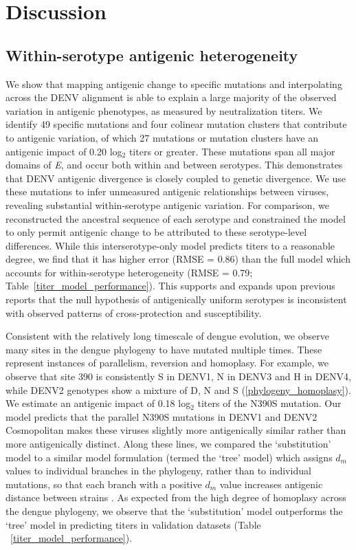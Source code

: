 \documentclass[11pt,oneside,letterpaper]{article}
\begin{document}
\section*{Discussion}

\subsection*{Within-serotype antigenic heterogeneity}

We show that mapping antigenic change to specific mutations and interpolating across the DENV alignment is able to explain a large majority of the observed variation in antigenic phenotypes, as measured by neutralization titers.
We identify 49 specific mutations and four colinear mutation clusters that contribute to antigenic variation, of which 27 mutations or mutation clusters have an antigenic impact of 0.20 log$_2$ titers or greater.
These mutations span all major domains of \textit{E}, and occur both within and between serotypes.
This demonstrates that DENV antigenic divergence is closely coupled to genetic divergence.
We use these mutations to infer unmeasured antigenic relationships between viruses, revealing substantial within-serotype antigenic variation.
For comparison, we reconstructed the ancestral sequence of each serotype and constrained the model to only permit antigenic change to be attributed to these serotype-level differences.
While this interserotype-only model predicts titers to a reasonable degree, we find that it has higher error (RMSE = 0.86) than the full model which accounts for within-serotype heterogeneity (RMSE = 0.79; Table~\ref{titer_model_performance}).
This supports and expands upon previous reports \citep{katzelnick2015dengue,forshey2016incomplete,waggoner2016homotypic} that the null hypothesis of antigenically uniform serotypes is inconsistent with observed patterns of cross-protection and susceptibility.

Consistent with the relatively long timescale of dengue evolution, we observe many sites in the dengue phylogeny to have mutated multiple times.
These represent instances of parallelism, reversion and homoplasy.
For example, we observe that site 390 is consistently S in DENV1, N in DENV3 and H in DENV4, while DENV2 genotypes show a mixture of D, N and S (\ref{phylogeny_homoplasy}).
We estimate an antigenic impact of 0.18 log$_2$ titers of the N390S mutation.
Our model predicts that the parallel N390S mutations in DENV1 and DENV2 Cosmopolitan makes these viruses slightly more antigenically similar rather than more antigenically distinct.
Along these lines, we compared the `substitution' model to a similar model formulation (termed the `tree' model) which assigns $d_m$ values to individual branches in the phylogeny, rather than to individual mutations, so that each branch with a positive $d_m$ value increases antigenic distance between strains \citep{neher2016prediction}.
As expected from the high degree of homoplasy across the dengue phylogeny, we observe that the `substitution' model outperforms the `tree' model in predicting titers in validation datasets (Table ~\ref{titer_model_performance}).
\end{document}
